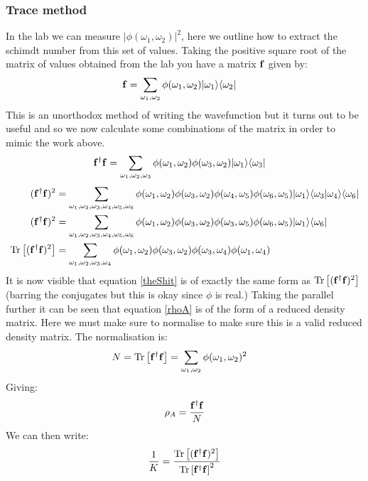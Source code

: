 \subsubsection{Trace method}
In the lab we can measure $|\phi(\omega_1,\omega_2)|^2$, here we outline how to extract the schimdt number from this set of values. Taking the positive square root of the matrix of values obtained from the lab you have a matrix ${\bf f}$ given by:
\begin{align}
{\bf f}&=\sum_{\omega_1,\omega_2}\phi(\omega_1,\omega_2)|\omega_1\rangle\langle\omega_2|
\end{align}
This is an unorthodox method of writing the wavefunction but it turns out to be useful and so we now calculate some combinations of the matrix in order to mimic the work above.
\begin{align}\label{rhoA}
{\bf f}^{\dagger}{\bf f}&=\sum_{\omega_1,\omega_2,\omega_3}\phi(\omega_1,\omega_2)\phi(\omega_3,\omega_2)|\omega_1\rangle\langle\omega_3|
\end{align}
\begin{align}
({\bf f}^{\dagger}{\bf f})^2&=\sum_{\omega_1,\omega_2,\omega_3,\omega_4,\omega_5,\omega_6}\phi(\omega_1,\omega_2)\phi(\omega_3,\omega_2)\phi(\omega_4,\omega_5)\phi(\omega_6,\omega_5)|\omega_1\rangle\langle\omega_3|\omega_4\rangle\langle\omega_6|\\
({\bf f}^{\dagger}{\bf f})^2&=\sum_{\omega_1,\omega_2,\omega_3,\omega_4,\omega_5,\omega_6}\phi(\omega_1,\omega_2)\phi(\omega_3,\omega_2)\phi(\omega_3,\omega_5)\phi(\omega_6,\omega_5)|\omega_1\rangle\langle\omega_6|\\
\operatorname{Tr}\left [({\bf f}^{\dagger}{\bf f})^2 \right ]&=\sum_{\omega_1,\omega_2,\omega_3,\omega_4}\phi(\omega_1,\omega_2)\phi(\omega_3,\omega_2)\phi(\omega_3,\omega_4)\phi(\omega_1,\omega_4)
\end{align}
It is now visible that equation \ref{theShit} is of exactly the same form as $\operatorname{Tr}\left [({\bf f}^{\dagger}{\bf f})^2 \right ]$ (barring the conjugates but this is okay since $\phi$ is real.) Taking the parallel further it can be seen that equation \ref{rhoA} is of the form of a reduced density matrix. Here we must make sure to normalise to make sure this is a valid reduced density matrix. The normalisation is:
\begin{align}
N = \operatorname{Tr}\left [{\bf f}^{\dagger}{\bf f} \right ]&=\sum_{\omega_1,\omega_2}\phi(\omega_1,\omega_2)^2
\end{align}
Giving:
\begin{align}
\rho_A = \frac{{\bf f}^{\dagger}{\bf f}}{N}
\end{align}
We can then write:
\begin{align}
\frac{1}{K}=\frac{\operatorname{Tr}\left [({\bf f}^{\dagger}{\bf f})^2 \right ]}{\operatorname{Tr}\left [{\bf f}^{\dagger}{\bf f} \right ]^2}
\end{align}
